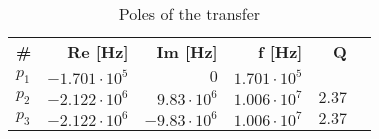 \begin{table}[H]
\centering
\begin{tabular}[c]{lrrrrr}
\textbf{\#} & \textbf{Re [Hz]} & \textbf{Im [Hz]} & \textbf{f [Hz]} & \textbf{Q} \\ 
\rowcolor{myyellow}
$p_{\mathrm{1}}$ &$-1.701 \cdot 10^{5}$ &$0$ &$1.701 \cdot 10^{5}$ \\ 
$p_{\mathrm{2}}$ &$-2.122 \cdot 10^{6}$ &$9.83 \cdot 10^{6}$ &$1.006 \cdot 10^{7}$ &$2.37$ \\ 
\rowcolor{myyellow}
$p_{\mathrm{3}}$ &$-2.122 \cdot 10^{6}$ &$-9.83 \cdot 10^{6}$ &$1.006 \cdot 10^{7}$ &$2.37$ \\ 
\end{tabular}
\caption{Poles of the transfer}
\label{tab-poles}
\end{table}

